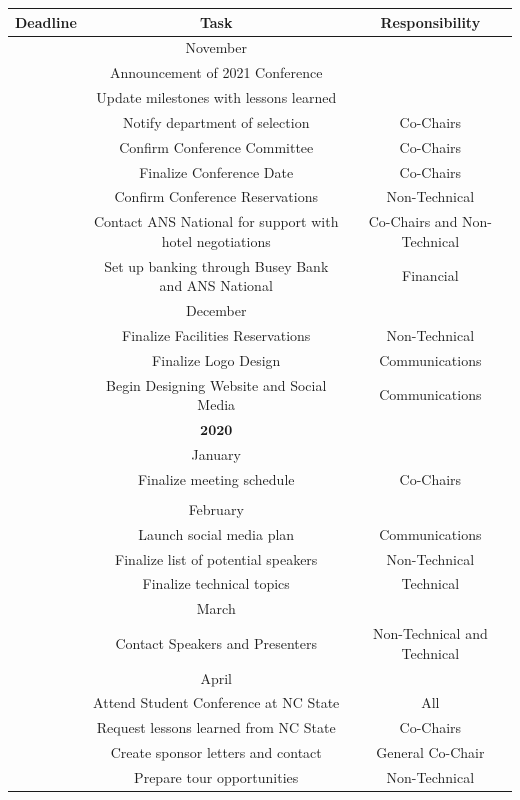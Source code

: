 \begin{center}
\begin{longtable}{c |  c  c}
\hline\hline
Deadline & Task & Responsibility\\
\hline\hline

&November&\\
\hline\hline
& Announcement of 2021 Conference & \\
& Update milestones with lessons learned &\\
& Notify department of selection & Co-Chairs\\
& Confirm Conference Committee & Co-Chairs\\
& Finalize Conference Date & Co-Chairs\\
& Confirm Conference Reservations & Non-Technical\\
& Contact ANS National for support with hotel negotiations& Co-Chairs and Non-Technical\\
& Set up banking through Busey Bank and ANS National& Financial\\
\hline\hline
&December&\\
\hline\hline
&Finalize Facilities Reservations& Non-Technical\\
&Finalize Logo Design& Communications\\
&Begin Designing Website and Social Media& Communications\\
\hline\hline
&$\textbf{2020}$&\\
\hline\hline
&January&\\
\hline\hline
& Finalize meeting schedule& Co-Chairs\\
&&\\
\hline\hline
&February&\\
\hline\hline
& Launch social media plan& Communications\\
&Finalize list of potential speakers& Non-Technical\\
& Finalize technical topics& Technical\\
\hline\hline
&March&\\
\hline\hline
& Contact Speakers and Presenters& Non-Technical and Technical\\
\hline\hline
&April&\\
\hline\hline
& Attend Student Conference at NC State& All\\
& Request lessons learned from NC State& Co-Chairs\\
& Create sponsor letters and contact & General Co-Chair\\
& Prepare tour opportunities& Non-Technical\\

\end{longtable}
\end{center}
